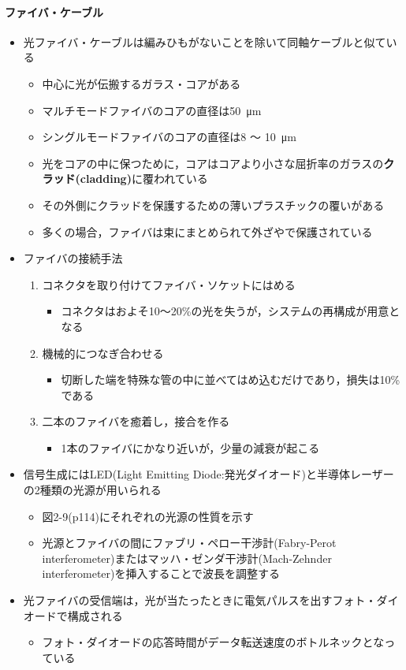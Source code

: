\documentclass[a4paper]{ltjsarticle}
\begin{document}
			\paragraph{ファイバ・ケーブル}
				\begin{itemize}
					\item 光ファイバ・ケーブルは編みひもがないことを除いて同軸ケーブルと似ている
					\begin{itemize}
						\item 中心に光が伝搬するガラス・コアがある
						\item マルチモードファイバのコアの直径は\SI{50}{\micro m}
						\item シングルモードファイバのコアの直径は8 ～ \SI{10}{\micro m}
						\item 光をコアの中に保つために，コアはコアより小さな屈折率のガラスの\textbf{クラッド(cladding)}に覆われている
						\item その外側にクラッドを保護するための薄いプラスチックの覆いがある
						\item 多くの場合，ファイバは束にまとめられて外ざやで保護されている
					\end{itemize}
					\item ファイバの接続手法
					\begin{enumerate}
						\item コネクタを取り付けてファイバ・ソケットにはめる
						\begin{itemize}
							\item コネクタはおよそ10～20\%の光を失うが，システムの再構成が用意となる
						\end{itemize}
						\item 機械的につなぎ合わせる
						\begin{itemize}
							\item 切断した端を特殊な管の中に並べてはめ込むだけであり，損失は10\%である
						\end{itemize}
						\item 二本のファイバを癒着し，接合を作る
						\begin{itemize}
							\item 1本のファイバにかなり近いが，少量の減衰が起こる
						\end{itemize}
					\end{enumerate}
					\item 信号生成にはLED(Light Emitting Diode:発光ダイオード)と半導体レーザーの2種類の光源が用いられる
					\begin{itemize}
						\item 図2-9(p114)にそれぞれの光源の性質を示す
						\item 光源とファイバの間にファブリ・ペロー干渉計(Fabry-Perot interferometer)またはマッハ・ゼンダ干渉計(Mach-Zehnder interferometer)を挿入することで波長を調整する
					\end{itemize}
					\item 光ファイバの受信端は，光が当たったときに電気パルスを出すフォト・ダイオードで構成される
					\begin{itemize}
						\item フォト・ダイオードの応答時間がデータ転送速度のボトルネックとなっている
					\end{itemize}
				\end{itemize}
\end{document}
